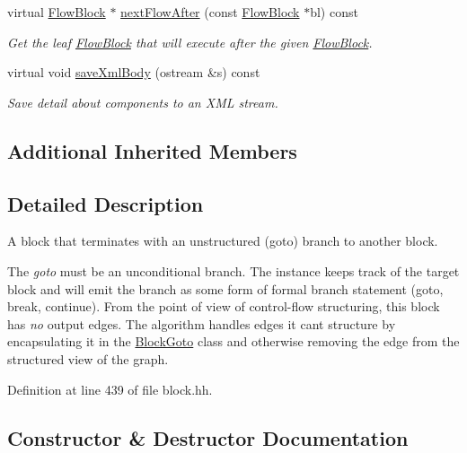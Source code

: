 \begin{DoxyCompactItemize}
virtual \mbox{\hyperlink{class_flow_block}{Flow\+Block}} $\ast$ \mbox{\hyperlink{class_block_goto_acc1628a26572e23d61f4b4dad717816e}{next\+Flow\+After}} (const \mbox{\hyperlink{class_flow_block}{Flow\+Block}} $\ast$bl) const
\begin{DoxyCompactList}\small\item\em Get the leaf \mbox{\hyperlink{class_flow_block}{Flow\+Block}} that will execute after the given \mbox{\hyperlink{class_flow_block}{Flow\+Block}}. \end{DoxyCompactList}\item 
virtual void \mbox{\hyperlink{class_block_goto_a4210ef977a85a74b9923e405057b093b}{save\+Xml\+Body}} (ostream \&s) const
\begin{DoxyCompactList}\small\item\em Save detail about components to an X\+ML stream. \end{DoxyCompactList}\end{DoxyCompactItemize}
\subsection*{Additional Inherited Members}


\subsection{Detailed Description}
A block that terminates with an unstructured (goto) branch to another block. 

The {\itshape goto} must be an unconditional branch. The instance keeps track of the target block and will emit the branch as some form of formal branch statement (goto, break, continue). From the point of view of control-\/flow structuring, this block has {\itshape no} output edges. The algorithm handles edges it can\textquotesingle{}t structure by encapsulating it in the \mbox{\hyperlink{class_block_goto}{Block\+Goto}} class and otherwise removing the edge from the structured view of the graph. 

Definition at line 439 of file block.\+hh.



\subsection{Constructor \& Destructor Documentation}
\mbox{\label{class_block_goto_a4dd56b2b7ce073b0ce3134db02708e80}} 
